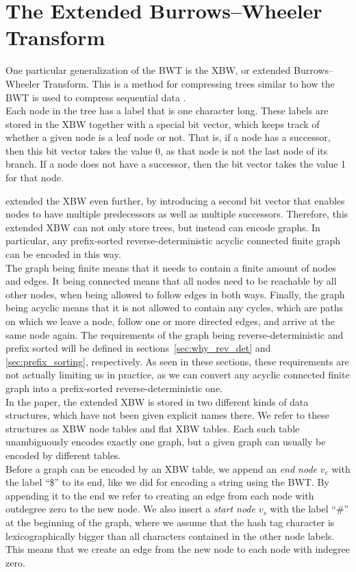 \documentclass[a4paper,12pt,twoside,BCOR=10mm]{scrbook}
\begin{document}
\section{The Extended Burrows--Wheeler Transform}

One particular generalization of the BWT is the XBW, or extended Burrows--Wheeler Transform.
This is a method for compressing trees similar to how the
BWT is used to compress sequential data \citep{Ferragina2009}. \\
Each node in the tree has a label that is one character long.
These labels are stored in the XBW together with a special bit vector,
which keeps track of whether a given node is a leaf node or not.
That is, if a node has a successor, then this bit vector takes the value 0, as that node is not the last node
of its branch. If a node does not have a successor, then the bit vector takes the value 1 for that node.

\citet{Siren2014} extended the XBW even further, by introducing a second bit vector that enables nodes
to have multiple predecessors as well as multiple successors. Therefore, this extended XBW can not only
store trees, but instead can encode graphs.
In particular, any prefix-sorted reverse-deterministic
acyclic connected finite graph can be encoded in this way. \\
The graph being finite means that
it needs to contain a finite amount of nodes and edges. It being connected means that all
nodes need to be reachable by all other nodes, when being allowed to follow edges in both ways.
Finally, the graph being acyclic means that it is
not allowed to contain any cycles, which are paths on which we leave a node, follow one
or more directed edges, and arrive at the same node again.
The requirements of the graph being reverse-deterministic and prefix sorted
will be defined in sections~\ref{sec:why_rev_det} and \ref{sec:prefix_sorting}, respectively.
As seen in these sections,
these requirements are not actually limiting us in practice,
as we can convert any acyclic connected finite graph
into a prefix-sorted reverse-deterministic one. \\
In the paper, the extended XBW is stored in two different kinds of data structures,
which have not been given explicit names there. We refer to these structures as
XBW node tables and flat XBW tables.
Each such table unambiguously encodes exactly one graph, but a given graph
can usually be encoded by different tables. \\
Before a graph can be encoded by an XBW table, we append an \textit{end node} $ v_e $ with the label “\$”
to its end,
like we did for encoding a string using the BWT.
By appending it to the end we refer to creating an edge from each node with outdegree zero to the new node.
We also insert a \textit{start node} $ v_s $ with the label “$\#$” at the beginning of the graph,
where we assume that the hash tag character is lexicographically bigger
than all characters contained in the other node labels.
This means that we create an edge from the new node to each node with indegree zero.
\end{document}
